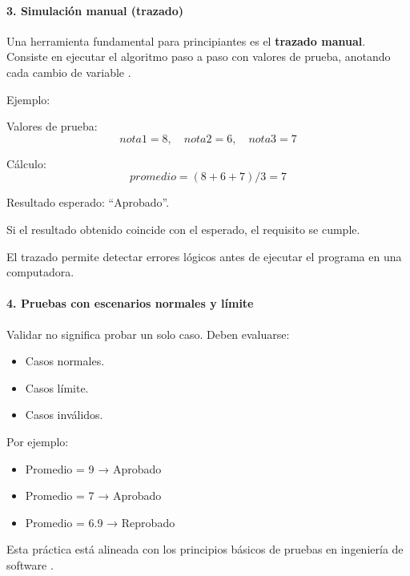\documentclass[12pt,twoside]{book}
\begin{document}
						\paragraph{3. Simulación manual (trazado)}
						
						Una herramienta fundamental para principiantes es el \textbf{trazado manual}. Consiste en ejecutar el algoritmo paso a paso con valores de prueba, anotando cada cambio de variable \cite{Hanly2015Problem}.
						
						Ejemplo:
						
						Valores de prueba:
						\[
						nota1 = 8,\quad nota2 = 6,\quad nota3 = 7
						\]
						
						Cálculo:
						\[
						promedio = (8 + 6 + 7) / 3 = 7
						\]
						
						Resultado esperado: “Aprobado”.
						
						Si el resultado obtenido coincide con el esperado, el requisito se cumple.
						
						El trazado permite detectar errores lógicos antes de ejecutar el programa en una computadora.
						
						\paragraph{4. Pruebas con escenarios normales y límite}
						
						Validar no significa probar un solo caso. Deben evaluarse:
						
						\begin{itemize}
							\item Casos normales.
							\item Casos límite.
							\item Casos inválidos.
						\end{itemize}
						
						Por ejemplo:
						
						\begin{itemize}
							\item Promedio = 9 → Aprobado
							\item Promedio = 7 → Aprobado
							\item Promedio = 6.9 → Reprobado
						\end{itemize}
						
						Esta práctica está alineada con los principios básicos de pruebas en ingeniería de software \cite{Sommerville2015Software,SWEBOK2025Guide}.
						
\end{document}
